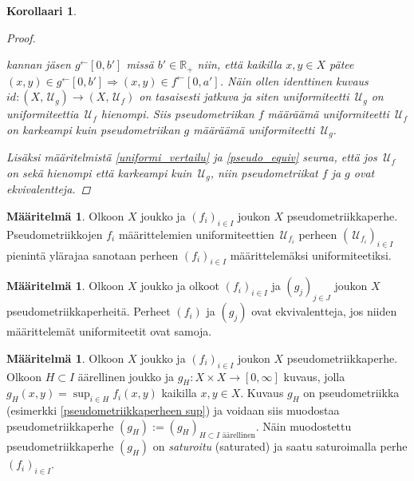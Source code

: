 \documentclass[12pt,a4paper,leqno]{report}
\newcommand{\R}{\mathbb{R}}
\newcommand{\U}{\,\mathcal{U}}
\theoremstyle{plain}
\newtheorem{kor}[equation]{Korollaari}
\theoremstyle{definition}
\newtheorem{maar}[equation]{Määritelmä}
\newtheorem{esim}[equation]{Esimerkki}
\theoremstyle{remark}
\begin{document}
\begin{kor}
\begin{proof}
\begin{enumerate}
kannan jäsen $g^{\leftarrow}[0,b']$ missä $b'\in\R_+$ niin, 
että kaikilla $x,y\in X$ pätee $(x,y)\in g^{\leftarrow}[0,b']\Rightarrow (x,y)\in f^{\leftarrow}[0,a']$. 
Näin ollen identtinen kuvaus $id\colon (X,\U_g)\rightarrow (X,\U_f)$ on 
tasaisesti jatkuva ja siten uniformiteetti $\U_g$ on uniformiteettia $\U_f$ hienompi. 
Siis pseudometriikan $f$ määräämä uniformiteetti 
$\U_f$ 
on karkeampi kuin pseudometriikan $g$ määräämä uniformiteetti $\U_g$.
\end{enumerate}
Lisäksi 
määritelmistä \ref{uniformi_vertailu} ja \ref{pseudo_equiv} seuraa, että jos $\U_f$ on sekä hienompi että karkeampi kuin $\U_g$, niin pseudometriikat $f$ ja $g$ ovat ekvivalentteja.
\end{proof}
\end{kor}
\begin{maar}
Olkoon $X$ joukko ja $(f_i)_{i\in I} $ joukon $X$ pseudometriikkaperhe. 
Pseudometriikkojen $f_i$ määrittelemien uniformiteettien $\U_{f_i}$ perheen $(\U_{f_i})_{i\in I}$ pienintä ylärajaa sanotaan perheen $(f_i)_{i\in I}$ määrittelemäksi uniformiteetiksi. 
\end{maar}
\begin{maar}
Olkoon $X$ joukko ja olkoot $(f_i)_{i\in I} $ ja $(g_j)_{j\in J} $ joukon $X$ pseudometriikkaperheitä. 
Perheet $(f_i)$ ja $(g_j) $ ovat ekvivalentteja, jos niiden määrittelemät uniformiteetit ovat samoja.
\end{maar}
\begin{maar}\label{saturoitu maar}
Olkoon $X$ joukko
ja $(f_i)_{i\in I} $ joukon $X$ pseudometriikkaperhe. 
Olkoon $H\subset I$ äärellinen joukko ja $g_{H}\colon X\times X\rightarrow [0,\infty]$ kuvaus, 
jolla $g_{H}(x,y)=\sup_{i\in H}f_i(x,y)$ kaikilla $x,y\in X$. 
Kuvaus $g_{H}$ on pseudometriikka 
(esimerkki \ref{pseudometriikkaperheen sup}) 
ja voidaan siis muodostaa pseudometriikkaperhe 
$(g_{H}):=(g_{H})_{H\subset I \text{ äärellinen}}$. 
Näin 
muodostettu pseudometriikkaperhe $(g_H)$ on
 \emph{saturoitu} (saturated) ja 
saatu saturoimalla perhe $(f_i)_{i\in I}$. 
\end{maar}
\end{document}
